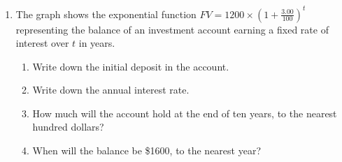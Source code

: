 \documentclass[12pt, twoside]{article}
\begin{document}
\begin{enumerate}
\newpage
\item The graph shows the exponential function $\displaystyle FV=1200 \times \left( 1+\frac{3.00}{100} \right)^t$ representing the balance of an investment account earning a fixed rate of interest over $t$ in years.
\begin{multicols}{2}
    \begin{enumerate}[itemsep=1cm]
        \item Write down the initial deposit in the account.
        \item Write down the annual interest rate.
        \item How much will the account hold at the end of ten years, to the nearest hundred dollars?
        \item When will the balance be \$1600, to the nearest year?
    \end{enumerate}\vspace{1cm}
    \begin{center}
    \end{center}
    \end{multicols}


\end{enumerate}
\end{document}
